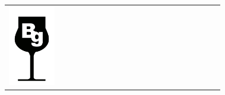{\begin{center}
\begin{tabular}{ >{\centering\arraybackslash}p{0.18\linewidth}  >{\centering\arraybackslash}p{0.18\linewidth}  >{\centering\arraybackslash}p{0.18\linewidth}  >{\centering\arraybackslash}p{0.18\linewidth}}
\includegraphics[scale=0.021, trim= 0em -5em -5em -5em,]{Icones/icon_bourgogne_black.pdf}
&

\end{tabular}
\end{center}}
